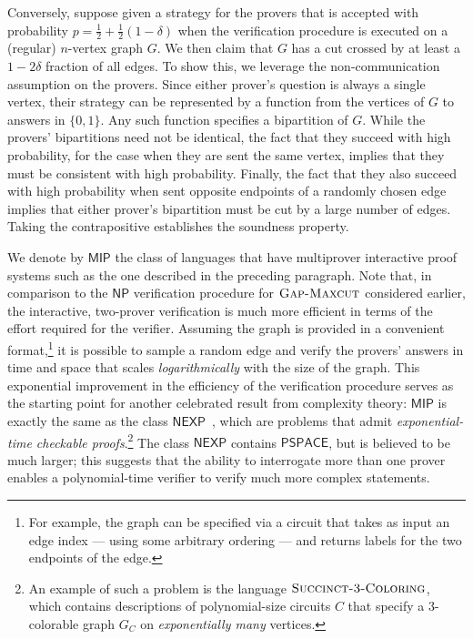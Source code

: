 \documentclass[11pt]{article}
\theoremstyle{definition}
\newcommand{\GX}{\textsc{Gap-Maxcut}}
\newcommand{\class}[1]{\ensuremath{\mathsf{#1}}\xspace}
\newcommand{\NP}{\class{NP}} %
\newcommand{\NEXP}{\class{NEXP}} %
\newcommand{\PSPACE}{\class{PSPACE}} %
\newcommand{\MIP}{\class{MIP}} %
\begin{document}
Conversely, suppose given a strategy for the provers that is accepted with probability $p = \frac{1}{2} + \frac{1}{2}(1-\delta)$ when the verification procedure is executed on a (regular) $n$-vertex graph $G$. 
We then claim that $G$ has a cut crossed by at least a $1-2\delta$ fraction of all edges. To show this, we leverage the non-communication assumption on the provers. Since either prover's question is always a single vertex, their strategy can be represented by a function from the vertices of $G$ to answers in $\{0,1\}$. Any such function specifies a bipartition of $G$. While the provers'  bipartitions need not be identical, the fact that they succeed with high probability, for the case when they are sent the same vertex, implies that they must be consistent with high probability. Finally, the fact that they also succeed with high probability when sent opposite endpoints of a randomly chosen edge implies that either prover's bipartition must be cut by a large number of edges. Taking the contrapositive establishes the soundness property.

We denote by $\MIP$ the class of languages that have multiprover interactive proof systems such as the one described in the preceding paragraph. 
Note that, in comparison to the $\NP$ verification procedure for $\GX$ considered earlier, the interactive, two-prover verification is much more efficient in terms of the effort required for the verifier.
 Assuming the graph is provided in a convenient format,\footnote{For example, the graph can be specified via a circuit that takes as input an edge index --- using some arbitrary ordering --- and returns labels for the two endpoints of the edge.} it is possible to sample a random edge and verify the provers' answers in time and space that scales \emph{logarithmically} with the size of the graph. %
 This exponential improvement in the efficiency of the verification procedure serves as the starting point for another celebrated result from complexity theory: $\mathsf{MIP}$ is exactly the same as the class $\mathsf{NEXP}$~\cite{babai1991non}, which are problems that admit \emph{exponential-time checkable proofs}.\footnote{An example of such a problem is the language $\textsc{Succinct-3-Coloring}$, which contains descriptions of polynomial-size circuits $C$ that specify a $3$-colorable graph $G_C$ on \emph{exponentially many} vertices.} The class $\NEXP$ contains $\PSPACE$, but is believed to be much larger; this suggests that the ability to interrogate more than one prover enables a polynomial-time verifier to verify much more complex statements.
 
\end{document}

